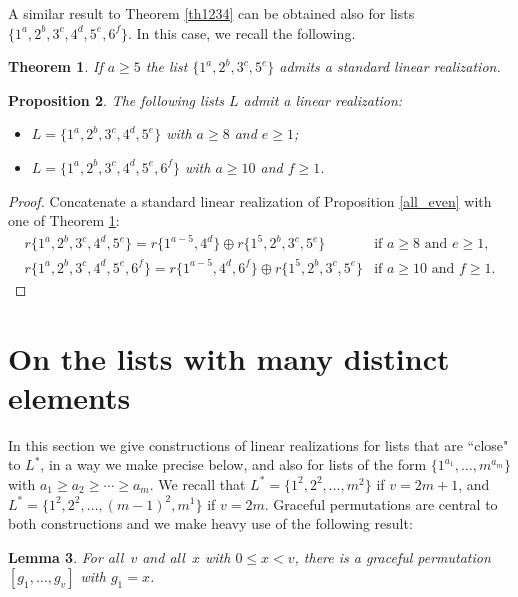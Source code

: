 \documentclass{amsart}
\newtheorem{prop}{Proposition}[section]
\newtheorem{lem}[prop]{Lemma}
\newtheorem{thm}[prop]{Theorem}
\theoremstyle{definition}
\numberwithin{equation}{section}
\def\ol{\oplus}
\begin{document}
A similar result to Theorem \ref{th1234} can be obtained also for lists $\{1^a,2^b,3^c,4^d,5^e,6^f\}$.
In this case, we recall the following.

\begin{thm}\cite[Theorem 2.6]{PP1}\label{1235}
If  $a\geq 5$ the list $\{1^a, 2^b, 3^c, 5^e\}$ admits a standard linear realization.
\end{thm}


\begin{prop}
The following lists $L$ admit a linear realization:
\begin{itemize}
\item[(1)] $L=\{1^a, 2^b, 3^c, 4^d, 5^e\}$ with $a \geq 8$ and $e\geq 1$;
\item[(2)] $L=\{1^a, 2^b, 3^c, 4^d, 5^e, 6^f\}$ with $a \geq 10$ and $f\geq 1$.
\end{itemize}
\end{prop}

\begin{proof}
Concatenate a standard linear realization of Proposition \ref{all_even} with one of Theorem \ref{1235}:
$$\begin{array}{ll}
r\{1^a,2^b,3^c,4^d,5^e\}=r\{1^{a-5},4^d\} \ol r\{1^5,2^b,3^c,5^e\} & \textrm{if } a\geq 8 \textrm{ and } e\geq 1,\\
r\{1^a,2^b,3^c,4^d,5^e,6^f\}=r\{1^{a-5}, 4^d, 6^f\}\ol r\{1^5,2^b,3^c,5^e\} & \textrm{if } a\geq 10 \textrm{ and } f\geq 1.
  \end{array}$$
\end{proof}



\section{On the lists with many distinct elements}\label{sec:small}

In this section we give constructions of linear realizations for lists that are ``close" to $L^*$,
in a way we make precise below, and also for lists of the form $\{ 1^{a_1}, \ldots, m^{a_m} \}$ with $a_1 \geq a_2 \geq \cdots \geq a_m$.
We recall that  $L^* = \{ 1^2, 2^2, \ldots, m^2 \}$ if $v = 2m+1$, and $L^* = \{ 1^2, 2^2, \ldots, (m-1)^2, m^1 \}$ if $v=2m$.
Graceful permutations are central to both constructions and we make heavy use of the following result:

\begin{lem}\label{lem:g1}{\rm \cite{Kotzig73}}
For all~$v$ and all~$x$ with  $0 \leq x < v$, there is a graceful permutation $[g_1, \ldots, g_v]$ with $g_1=x$.
\end{lem}
\end{document}
